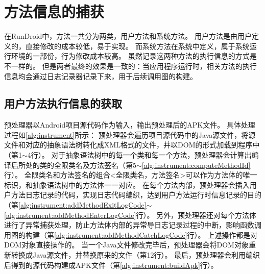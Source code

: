 

\section{方法信息的捕获}

在RunDroid中，方法一共分为两类，用户方法和系统方法。
用户方法是由用户定义的，直接修改的成本较低，易于实现。
而系统方法在系统中定义，属于系统运行环境的一部份，行为修改成本较高。
虽然记录这两种方法的执行信息的方式是不一样的。
但是两者最终的效果是一致的：当应用程序运行时，相关方法的执行信息均会通过日志记录器记录下来，用于后续调用图的构建。


\subsection{用户方法执行信息的获取}%


预处理器以Android项目源代码作为输入，输出预处理后的APK文件。
具体处理过程如\autoref{alg:instrument}所示：
预处理器会遍历项目源代码中的Java源文件，将源文件和对应的抽象语法树转化成XML格式的文件，并以DOM的形式加载到程序中（第1$\sim$4行）。
对于抽象语法树中的每一个类和每一个方法，预处理器会计算出编译后所处的类的全限类名及方法签名（第5$\sim$\ref{alg:instrument:computeMethodId}行）。
全限类名和方法签名的组合<全限类名，方法签名>可以作为方法体的唯一标识，和抽象语法树中的方法体一一对应。
在每个方法内部，预处理器会插入用户方法日志记录的代码，实现日志代码编织，达到用户方法运行时信息记录的目的（第\ref{alg:instrument:addMethodExitLogCode}$\sim$\ref{alg:instrument:addMethodEnterLogCode}行）。
另外，预处理器还对每个方法体进行了异常捕获处理，防止方法体内部的异常导日志记录过程的中断，影响函数调用图的构建（第\ref{alg:instrument:addMethodCatchLogCode}行）。
上述操作都是对DOM对象直接操作的。
当一个Java文件修改完毕后，预处理器会将DOM对象重新转换成Java源文件，并替换原来的文件（第12行）。
最后，预处理器会利用编织后得到的源代码构建成APK文件（第\ref{alg:instrument:buildApk}行）。




